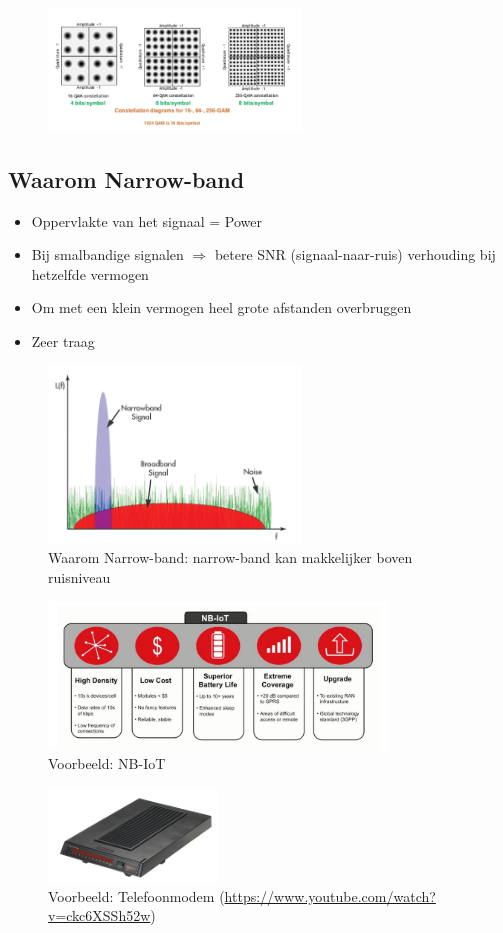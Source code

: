 \documentclass{article}
\begin{document}
\begin{figure}[H]
    \centering
    \includegraphics[width=0.6\textwidth]{Screenshot_20200302_123030.png}
    \caption{}
\end{figure}

\subsection{Waarom Narrow-band}
\begin{itemize}
    \item Oppervlakte van het signaal = Power
    \item Bij smalbandige signalen $\Rightarrow$ betere SNR (signaal-naar-ruis) verhouding bij hetzelfde vermogen
    \item Om met een klein vermogen heel grote afstanden overbruggen
    \item Zeer traag
\end{itemize}

\begin{figure}[H]
    \centering
    \includegraphics[width=0.6\textwidth]{Screenshot_20200302_123310.png}
    \caption{Waarom Narrow-band: narrow-band kan makkelijker boven ruisniveau}
\end{figure}

\begin{figure}[H]
    \centering
    \includegraphics[width=0.8\textwidth]{Screenshot_20200302_122906.png}
    \caption{Voorbeeld: NB-IoT}
\end{figure}

\begin{figure}[H]
    \centering
    \includegraphics[width=0.4\textwidth]{Screenshot_20200302_122954.png}
    \caption{Voorbeeld: Telefoonmodem (\url{https://www.youtube.com/watch?v=ckc6XSSh52w})}
\end{figure}
\end{document}
